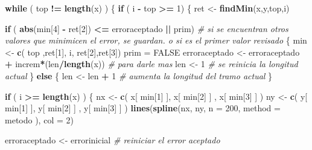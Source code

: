\documentclass[]{article}
\newenvironment{Shaded}{\begin{snugshade}}{\end{snugshade}}
\newcommand{\KeywordTok}[1]{\textcolor[rgb]{0.13,0.29,0.53}{\textbf{#1}}}
\newcommand{\DataTypeTok}[1]{\textcolor[rgb]{0.13,0.29,0.53}{#1}}
\newcommand{\DecValTok}[1]{\textcolor[rgb]{0.00,0.00,0.81}{#1}}
\newcommand{\StringTok}[1]{\textcolor[rgb]{0.31,0.60,0.02}{#1}}
\newcommand{\CommentTok}[1]{\textcolor[rgb]{0.56,0.35,0.01}{\textit{#1}}}
\newcommand{\OtherTok}[1]{\textcolor[rgb]{0.56,0.35,0.01}{#1}}
\newcommand{\ControlFlowTok}[1]{\textcolor[rgb]{0.13,0.29,0.53}{\textbf{#1}}}
\newcommand{\OperatorTok}[1]{\textcolor[rgb]{0.81,0.36,0.00}{\textbf{#1}}}
\newcommand{\NormalTok}[1]{#1}
\begin{document}
\begin{Shaded}
\begin{Highlighting}[]
  \ControlFlowTok{while}\NormalTok{ ( top }\OperatorTok{!=}\StringTok{ }\KeywordTok{length}\NormalTok{(x) )}
\NormalTok{  \{}
    \ControlFlowTok{if}\NormalTok{ ( i }\OperatorTok{-}\StringTok{ }\NormalTok{top }\OperatorTok{>=}\StringTok{ }\DecValTok{1}\NormalTok{)}
\NormalTok{    \{}
\NormalTok{      ret <-}\StringTok{ }\KeywordTok{findMin}\NormalTok{(x,y,top,i) }
      
      \ControlFlowTok{if}\NormalTok{ ( }\KeywordTok{abs}\NormalTok{(min[}\DecValTok{4}\NormalTok{] }\OperatorTok{-}\StringTok{ }\NormalTok{ret[}\DecValTok{2}\NormalTok{]) }\OperatorTok{<=}\StringTok{ }\NormalTok{erroraceptado }\OperatorTok{||}\StringTok{ }\NormalTok{prim) }\CommentTok{# si se encuentran otros valores que minimicen el error, se guardan. o si es el primer valor revisado}
\NormalTok{      \{}
\NormalTok{        min <-}\StringTok{ }\KeywordTok{c}\NormalTok{( top ,ret[}\DecValTok{1}\NormalTok{], i, ret[}\DecValTok{2}\NormalTok{],ret[}\DecValTok{3}\NormalTok{])}
\NormalTok{        prim =}\StringTok{ }\OtherTok{FALSE}
\NormalTok{        erroraceptado <-}\StringTok{ }\NormalTok{erroraceptado }\OperatorTok{+}\StringTok{ }\NormalTok{increm}\OperatorTok{*}\NormalTok{(len}\OperatorTok{/}\KeywordTok{length}\NormalTok{(x)) }\CommentTok{# para darle mas }
\NormalTok{        len <-}\StringTok{ }\DecValTok{1} \CommentTok{# se reinicia la longitud actual }
\NormalTok{      \}}
      \ControlFlowTok{else}
\NormalTok{      \{}
\NormalTok{        len <-}\StringTok{ }\NormalTok{len }\OperatorTok{+}\StringTok{ }\DecValTok{1} \CommentTok{# aumenta la longitud del tramo actual}
\NormalTok{      \}}
      
      \ControlFlowTok{if}\NormalTok{ ( i }\OperatorTok{>=}\StringTok{ }\KeywordTok{length}\NormalTok{(x) )}
\NormalTok{      \{}
\NormalTok{        nx <-}\StringTok{ }\KeywordTok{c}\NormalTok{( x[ min[}\DecValTok{1}\NormalTok{] ], x[ min[}\DecValTok{2}\NormalTok{] ] , x[ min[}\DecValTok{3}\NormalTok{] ] )}
\NormalTok{        ny <-}\StringTok{ }\KeywordTok{c}\NormalTok{( y[ min[}\DecValTok{1}\NormalTok{] ], y[ min[}\DecValTok{2}\NormalTok{] ] , y[ min[}\DecValTok{3}\NormalTok{] ] )}
        \KeywordTok{lines}\NormalTok{(}\KeywordTok{spline}\NormalTok{(nx, ny, }\DataTypeTok{n =} \DecValTok{200}\NormalTok{, }\DataTypeTok{method =}\NormalTok{ metodo ), }\DataTypeTok{col =} \DecValTok{2}\NormalTok{)}
        
\NormalTok{        erroraceptado <-}\StringTok{ }\NormalTok{errorinicial }\CommentTok{# reiniciar el error aceptado}
        

\end{Highlighting}
\end{Shaded}
\end{document}
